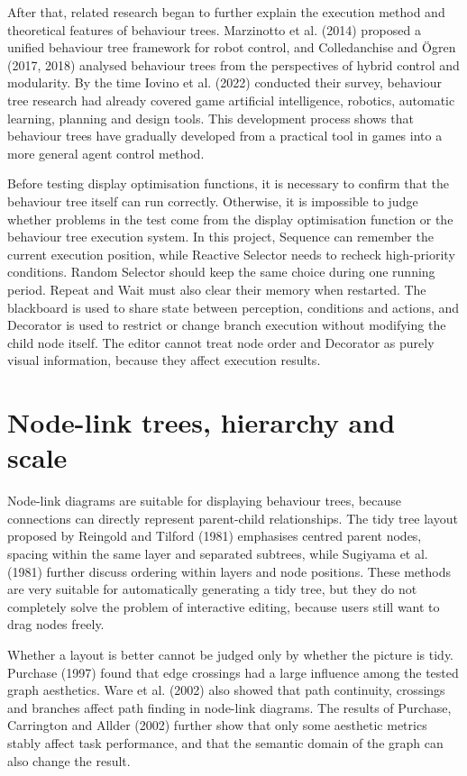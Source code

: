 \documentclass[11pt,a4paper,oneside,extrafontsizes]{memoir}
\begin{document}
After that, related research began to further explain the execution method and theoretical features of behaviour trees. Marzinotto et al. (2014) proposed a unified behaviour tree framework for robot control, and Colledanchise and Ögren (2017, 2018) analysed behaviour trees from the perspectives of hybrid control and modularity. By the time Iovino et al. (2022) conducted their survey, behaviour tree research had already covered game artificial intelligence, robotics, automatic learning, planning and design tools. This development process shows that behaviour trees have gradually developed from a practical tool in games into a more general agent control method.

Before testing display optimisation functions, it is necessary to confirm that the behaviour tree itself can run correctly. Otherwise, it is impossible to judge whether problems in the test come from the display optimisation function or the behaviour tree execution system. In this project, Sequence can remember the current execution position, while Reactive Selector needs to recheck high-priority conditions. Random Selector should keep the same choice during one running period. Repeat and Wait must also clear their memory when restarted. The blackboard is used to share state between perception, conditions and actions, and Decorator is used to restrict or change branch execution without modifying the child node itself. The editor cannot treat node order and Decorator as purely visual information, because they affect execution results.

\section{Node-link trees, hierarchy and scale}

Node-link diagrams are suitable for displaying behaviour trees, because connections can directly represent parent-child relationships. The tidy tree layout proposed by Reingold and Tilford (1981) emphasises centred parent nodes, spacing within the same layer and separated subtrees, while Sugiyama et al. (1981) further discuss ordering within layers and node positions. These methods are very suitable for automatically generating a tidy tree, but they do not completely solve the problem of interactive editing, because users still want to drag nodes freely.

Whether a layout is better cannot be judged only by whether the picture is tidy. Purchase (1997) found that edge crossings had a large influence among the tested graph aesthetics. Ware et al. (2002) also showed that path continuity, crossings and branches affect path finding in node-link diagrams. The results of Purchase, Carrington and Allder (2002) further show that only some aesthetic metrics stably affect task performance, and that the semantic domain of the graph can also change the result.
\end{document}
